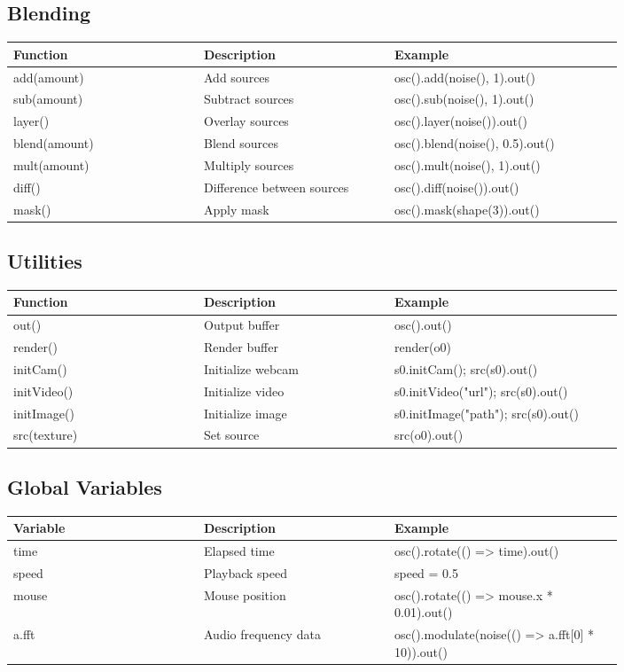 \documentclass[9pt,oneside]{amsart}
\begin{document}
\subsection*{Blending}
\begin{tabular}{L{0.25\linewidth}L{0.25\linewidth}L{0.3\linewidth}}
\toprule
\textbf{Function} & \textbf{Description} & \textbf{Example} \\
\midrule
add(amount) & Add sources & osc().add(noise(), 1).out() \\
sub(amount) & Subtract sources & osc().sub(noise(), 1).out() \\
layer() & Overlay sources & osc().layer(noise()).out() \\
blend(amount) & Blend sources & osc().blend(noise(), 0.5).out() \\
mult(amount) & Multiply sources & osc().mult(noise(), 1).out() \\
diff() & Difference between sources & osc().diff(noise()).out() \\
mask() & Apply mask & osc().mask(shape(3)).out() \\
\bottomrule
\end{tabular}

\subsection*{Utilities}
\begin{tabular}{L{0.25\linewidth}L{0.25\linewidth}L{0.3\linewidth}}
\toprule
\textbf{Function} & \textbf{Description} & \textbf{Example} \\
\midrule
out() & Output buffer & osc().out() \\
render() & Render buffer & render(o0) \\
initCam() & Initialize webcam & s0.initCam(); src(s0).out() \\
initVideo() & Initialize video & s0.initVideo("url"); src(s0).out() \\
initImage() & Initialize image & s0.initImage("path"); src(s0).out() \\
src(texture) & Set source & src(o0).out() \\
\bottomrule
\end{tabular}

\subsection*{Global Variables}
\begin{tabular}{L{0.25\linewidth}L{0.25\linewidth}L{0.3\linewidth}}
\toprule
\textbf{Variable} & \textbf{Description} & \textbf{Example} \\
\midrule
time & Elapsed time & osc().rotate(() => time).out() \\
speed & Playback speed & speed = 0.5 \\
mouse & Mouse position & osc().rotate(() => mouse.x * 0.01).out() \\
a.fft & Audio frequency data & osc().modulate(noise(() => a.fft[0] * 10)).out() \\
\bottomrule
\end{tabular}
\end{document}
